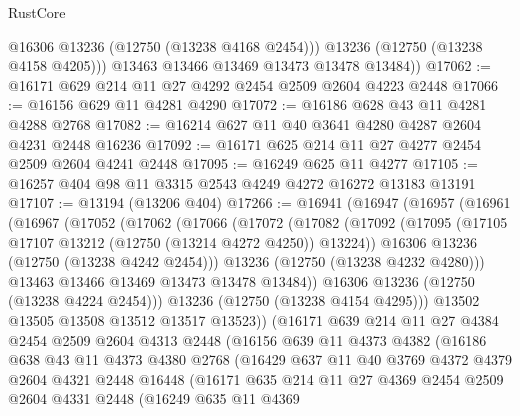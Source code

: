 \begin{lexlean}{RustCore}
\begin{coremodule}
            @16306
            @13236
            (@12750 (@13238 @4168 @2454)))
          @13236
          (@12750 (@13238 @4158 @4205)))
        @13463
        @13466
        @13469
        @13473
        @13478
        @13484))
@17062 := @16171 @629 @214 @11 @27 @4292 @2454 @2509 @2604 @4223 @2448
@17066 := @16156 @629 @11 @4281 @4290
@17072 := @16186 @628 @43 @11 @4281 @4288 @2768
@17082 := @16214 @627 @11 @40 @3641 @4280 @4287 @2604 @4231 @2448 @16236
@17092 := @16171 @625 @214 @11 @27 @4277 @2454 @2509 @2604 @4241 @2448
@17095 := @16249 @625 @11 @4277
@17105 := @16257 @404 @98 @11 @3315 @2543 @4249 @4272 @16272 @13183 @13191
@17107 := @13194 (@13206 @404)
@17266 := @16941
    (@16947
      (@16957
        (@16961
          (@16967
            (@17052
              (@17062
                (@17066
                  (@17072
                    (@17082
                      (@17092
                        (@17095 (@17105 @17107 @13212 (@12750 (@13214 @4272 @4250)) @13224))
                        @16306
                        @13236
                        (@12750 (@13238 @4242 @2454)))
                      @13236
                      (@12750 (@13238 @4232 @4280)))
                    @13463
                    @13466
                    @13469
                    @13473
                    @13478
                    @13484))
                @16306
                @13236
                (@12750 (@13238 @4224 @2454)))
              @13236
              (@12750 (@13238 @4154 @4295)))
            @13502
            @13505
            @13508
            @13512
            @13517
            @13523))
        (@16171
          @639
          @214
          @11
          @27
          @4384
          @2454
          @2509
          @2604
          @4313
          @2448
          (@16156
            @639
            @11
            @4373
            @4382
            (@16186
              @638
              @43
              @11
              @4373
              @4380
              @2768
              (@16429
                @637
                @11
                @40
                @3769
                @4372
                @4379
                @2604
                @4321
                @2448
                @16448
                (@16171
                  @635
                  @214
                  @11
                  @27
                  @4369
                  @2454
                  @2509
                  @2604
                  @4331
                  @2448
                  (@16249
                    @635
                    @11
                    @4369

\end{coremodule}
\end{lexlean}

